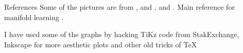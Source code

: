 \documentclass{beamer}
\begin{document}
\begin{frame}{References}
	Some of the pictures are from \citep{docarmoriemann}, and \citep{schutz}, and \citep{geron2}. Main reference for manifold learning \citep{rabadan}.
	\printbibliography 	
	
	I have used some of the graphs by hacking TiKz code from StakExchange, Inkscape for more aesthetic plots and other old tricks of \TeX
	
\end{frame}


	
\end{document}
